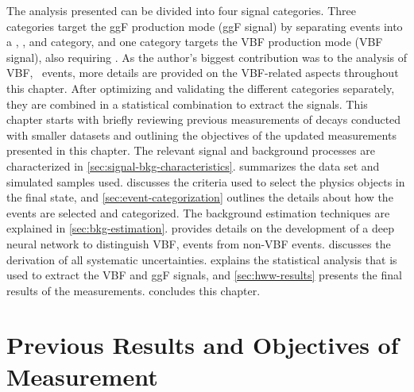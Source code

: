 The analysis presented can be divided into four signal categories. Three categories target the ggF production mode (ggF signal) by separating events into a \ZeroJet, \OneJet, and \TwoJet category, and one category targets the VBF production mode (VBF signal), also requiring \TwoJet. 
As the author's biggest contribution was to the analysis of VBF, \HWW\ events, more details are provided on the VBF-related aspects throughout this chapter. 
After optimizing and validating the different categories separately, they are combined in a statistical combination to extract the signals.  
This chapter starts with briefly reviewing previous measurements of \HWW decays conducted with smaller datasets and outlining the objectives of the updated measurements presented in this chapter. 
The relevant signal and background processes are characterized in \cref{sec:signal-bkg-characteristics}. 
 summarizes the data set and simulated samples used.
 discusses the criteria used to select the physics objects in the final state, and \cref{sec:event-categorization} outlines the details about how the events are selected and categorized. 
The background estimation techniques are explained in \cref{sec:bkg-estimation}. 
 provides details on the development of a deep neural network to distinguish VBF, \HWW events from non-VBF events. 
 discusses the derivation of all systematic uncertainties. 
 explains the statistical analysis that is used to extract the VBF and ggF signals, and \cref{sec:hww-results} presents the final results of the measurements.
 concludes this chapter.




\section{Previous Results and Objectives of Measurement}
\label{sec:prev-results}



